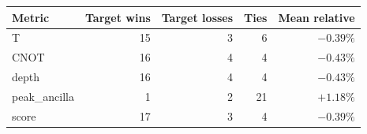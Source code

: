 \begin{tabular}{lrrrr}
\toprule
Metric & Target wins & Target losses & Ties & Mean relative \\
\midrule
T & 15 & 3 & 6 & $-0.39\%$ \\
CNOT & 16 & 4 & 4 & $-0.43\%$ \\
depth & 16 & 4 & 4 & $-0.43\%$ \\
peak_ancilla & 1 & 2 & 21 & $+1.18\%$ \\
score & 17 & 3 & 4 & $-0.39\%$ \\
\bottomrule
\end{tabular}
